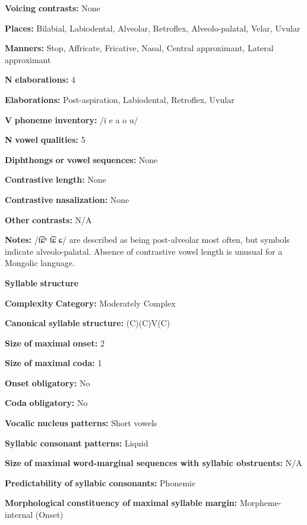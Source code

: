 \begin{styleBody}
\textbf{Voicing} \textbf{contrasts:} None

\textbf{Places:} Bilabial, Labiodental, Alveolar, Retroflex, Alveolo-palatal, Velar, Uvular

\textbf{Manners:} Stop, Affricate, Fricative, Nasal, Central approximant, Lateral approximant

\textbf{N} \textbf{elaborations:} 4

\textbf{Elaborations:} Post-aspiration, Labiodental, Retroflex, Uvular

\textbf{V} \textbf{phoneme} \textbf{inventory:} /i e a o u/

\textbf{N} \textbf{vowel} \textbf{qualities:} 5

\textbf{Diphthongs} \textbf{or} \textbf{vowel} \textbf{sequences:} None

\textbf{Contrastive} \textbf{length:} None

\textbf{Contrastive} \textbf{nasalization:} None

\textbf{Other} \textbf{contrasts:} N/A

\textbf{Notes:} /t͡ɕʰ t͡ɕ ɕ/ are described as being post-alveolar most often, but symbols indicate alveolo-palatal. Absence of contrastive vowel length is unusual for a Mongolic language.

\textbf{Syllable} \textbf{structure}

\textbf{Complexity} \textbf{Category:} Moderately Complex

\textbf{Canonical} \textbf{syllable} \textbf{structure:} (C)(C)V(C) \citep[54-72]{Slater2003}

\textbf{Size} \textbf{of} \textbf{maximal} \textbf{onset:} 2

\textbf{Size} \textbf{of} \textbf{maximal} \textbf{coda:} 1

\textbf{Onset} \textbf{obligatory:} No

\textbf{Coda} \textbf{obligatory:} No

\textbf{Vocalic} \textbf{nucleus} \textbf{patterns:} Short vowels

\textbf{Syllabic} \textbf{consonant} \textbf{patterns:} Liquid

\textbf{Size} \textbf{of} \textbf{maximal} \textbf{word{}-marginal sequences with syllabic obstruents:} N/A

\textbf{Predictability} \textbf{of} \textbf{syllabic} \textbf{consonants:} Phonemic

\textbf{Morphological} \textbf{constituency} \textbf{of} \textbf{maximal} \textbf{syllable} \textbf{margin:} Morpheme-internal (Onset)


\end{styleBody}
